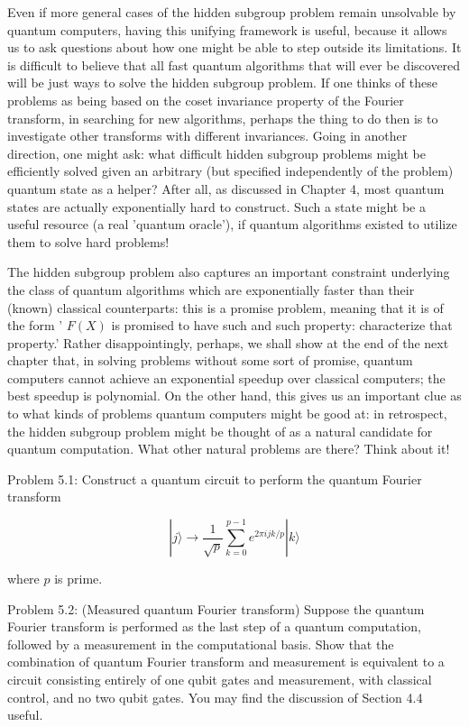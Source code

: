 Even if more general cases of the hidden subgroup problem remain unsolvable by quantum computers, having this unifying framework is useful, because it allows us to ask questions about how one might be able to step outside its limitations. It is difficult to believe that all fast quantum algorithms that will ever be discovered will be just ways to solve the hidden subgroup problem. If one thinks of these problems as being based on the coset invariance property of the Fourier transform, in searching for new algorithms, perhaps the thing to do then is to investigate other transforms with different invariances. Going in another direction, one might ask: what difficult hidden subgroup problems might be efficiently solved given an arbitrary (but specified independently of the problem) quantum state as a helper? After all, as discussed in Chapter 4, most quantum states are actually exponentially hard to construct. Such a state might be a useful resource (a real 'quantum oracle'), if quantum algorithms existed to utilize them to solve hard problems!

The hidden subgroup problem also captures an important constraint underlying the class of quantum algorithms which are exponentially faster than their (known) classical counterparts: this is a promise problem, meaning that it is of the form ' $F(X)$ is promised to have such and such property: characterize that property.' Rather disappointingly, perhaps, we shall show at the end of the next chapter that, in solving problems without some sort of promise, quantum computers cannot achieve an exponential speedup over classical computers; the best speedup is polynomial. On the other hand, this gives us an important clue as to what kinds of problems quantum computers might be good at: in retrospect, the hidden subgroup problem might be thought of as a natural candidate for quantum computation. What other natural problems are there? Think about it!

Problem 5.1: Construct a quantum circuit to perform the quantum Fourier transform

\begin{equation*}
|j\rangle \longrightarrow \frac{1}{\sqrt{p}} \sum_{k=0}^{p-1} e^{2 \pi i j k / p}|k\rangle \tag{5.79}
\end{equation*}

where $p$ is prime.

Problem 5.2: (Measured quantum Fourier transform) Suppose the quantum Fourier transform is performed as the last step of a quantum computation, followed by a measurement in the computational basis. Show that the combination of quantum Fourier transform and measurement is equivalent to a circuit consisting entirely of one qubit gates and measurement, with classical control, and no two qubit gates. You may find the discussion of Section 4.4 useful.

